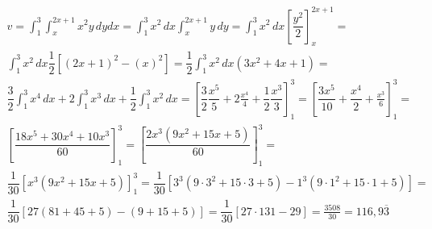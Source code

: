 \begin{enumerate}
	\begin{gather*}
		v = \int_1^3 \int_x^{2x + 1} x^2y\, dy dx = \int_1^3 x^2\, dx \int_x^{2x + 1} y\, dy =  \int_1^3 x^2\, dx \left[\dfrac{y^2}{2}\right]_x^{2x + 1} =\\  \int_1^3 x^2\, dx \dfrac{1}{2}\left[(2x + 1)^2 - (x)^2\right] = \dfrac{1}{2}\int_1^3 x^2\, dx \left(3x^2 + 4x + 1\right) =\\ \dfrac{3}{2}\int_1^3 x^4\, dx + 2\int_1^3 x^3\, dx + \dfrac{1}{2}\int_1^3 x^2\, dx = \left[\dfrac{3}{2}\dfrac{x^5}{5} + 2\frac{x^4}{4} + \dfrac{1}{2}\dfrac{x^3}{3}\right]_1^3 = \left[\dfrac{3x^5}{10} + \dfrac{x^4}{2} + \frac{x^3}{6}\right]_1^3 =\\ \left[\dfrac{18x^5 + 30x^4 + 10x^3}{60}\right]_1^3 = \left[\dfrac{2x^3\left(9x^2 + 15x + 5\right)}{60}\right]_1^3 =\\ \dfrac{1}{30}\left[x^3\left(9x^2 + 15x + 5\right)\right]_1^3 = \dfrac{1}{30}\left[3^3\left(9\cdot3^2 + 15\cdot3 + 5\right) - 1^3\left(9\cdot1^2 + 15\cdot1 + 5\right)\right] =\\ \dfrac{1}{30}\left[27(81 + 45 + 5) - (9 + 15 + 5)\right] = \dfrac{1}{30}\left[27\cdot131 - 29\right] = \frac{3508}{30} = 116,9\overline{3}	
	\end{gather*}
\end{enumerate}